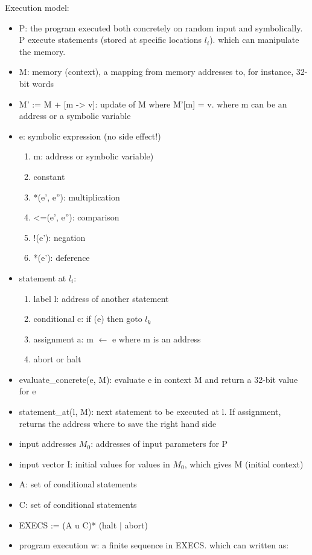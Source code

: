 \documentclass[10pt, a4paper]{article}
\begin{document}
Execution model:
\begin{itemize}
  \item P: the program executed both concretely on random input and symbolically. P execute statements (stored at specific locations $l_i$). which can manipulate the memory.
  \item M: memory (context), a mapping from memory addresses to, for instance, 32-bit words
  \item M' := M + [m -> v]: update of M where M'[m] = v. where m can be an address or a symbolic variable
  \item e: symbolic expression (no side effect!)
    \begin{enumerate}
      \item m: address or symbolic variable)
      \item constant
      \item *(e', e''): multiplication
      \item <=(e', e''): comparison
      \item !(e'): negation
      \item *(e'): deference
    \end{enumerate}
  \item statement at $l_i$:
    \begin{enumerate}
      \item label l: address of another statement
      \item conditional c: if (e) then goto $l_k$
      \item assignment a: m $\gets$ e where m is an address
      \item abort or halt
    \end{enumerate}
  \item evaluate\_concrete(e, M): evaluate e in context M and return a 32-bit value for e
  \item statement\_at(l, M): next statement to be executed at l. If assignment, returns the address where to save the right hand side
  \item input addresses $M_0$: addresses of input parameters for P
  \item input vector I: initial values for values in $M_0$, which gives M (initial context)
  \item A: set of conditional statements
  \item C: set of conditional statements
  \item EXECS := (A u C)* (halt $|$ abort)
  \item program execution w: a finite sequence in EXECS. which can written as:
  

\end{itemize}
\end{document}
